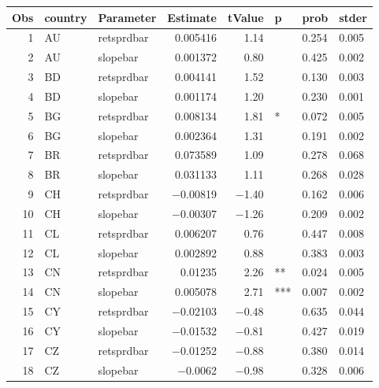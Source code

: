 

\begin{longtable}{|r|l|l|r|r|l|l|l|}\hline
   Obs &    country &    Parameter &    Estimate &    tValue &    p &    prob &    stder\\\hline
\endhead
   1 &    AU &    retsprdbar &    0.005416 &    1.14 &      &    0.254 &    0.005\\\hline
   2 &    AU &    slopebar &    0.001372 &    0.80 &      &    0.425 &    0.002\\\hline
   3 &    BD &    retsprdbar &    0.004141 &    1.52 &      &    0.130 &    0.003\\\hline
   4 &    BD &    slopebar &    0.001174 &    1.20 &      &    0.230 &    0.001\\\hline
   5 &    BG &    retsprdbar &    0.008134 &    1.81 &    * &    0.072 &    0.005\\\hline
   6 &    BG &    slopebar &    0.002364 &    1.31 &      &    0.191 &    0.002\\\hline
   7 &    BR &    retsprdbar &    0.073589 &    1.09 &      &    0.278 &    0.068\\\hline
   8 &    BR &    slopebar &    0.031133 &    1.11 &      &    0.268 &    0.028\\\hline
   9 &    CH &    retsprdbar &    $-$0.00819 &    $-$1.40 &      &    0.162 &    0.006\\\hline
   10 &    CH &    slopebar &    $-$0.00307 &    $-$1.26 &      &    0.209 &    0.002\\\hline
   11 &    CL &    retsprdbar &    0.006207 &    0.76 &      &    0.447 &    0.008\\\hline
   12 &    CL &    slopebar &    0.002892 &    0.88 &      &    0.383 &    0.003\\\hline
   13 &    CN &    retsprdbar &    0.01235 &    2.26 &    ** &    0.024 &    0.005\\\hline
   14 &    CN &    slopebar &    0.005078 &    2.71 &    *** &    0.007 &    0.002\\\hline
   15 &    CY &    retsprdbar &    $-$0.02103 &    $-$0.48 &      &    0.635 &    0.044\\\hline
   16 &    CY &    slopebar &    $-$0.01532 &    $-$0.81 &      &    0.427 &    0.019\\\hline
   17 &    CZ &    retsprdbar &    $-$0.01252 &    $-$0.88 &      &    0.380 &    0.014\\\hline
   18 &    CZ &    slopebar &    $-$0.0062 &    $-$0.98 &      &    0.328 &    0.006\\\hline

\end{longtable}

